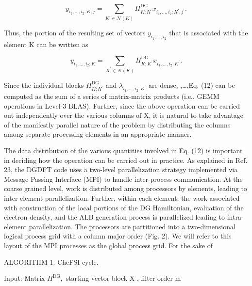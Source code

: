 \documentclass[
  10
]{article}
\begin{document}
\[
y _ {i _ {1}, \dots , i _ {2}; K, j} = \sum_ {K ^ {\prime} \in \mathcal {N} (K)} H _ {K; K ^ {\prime}} ^ {\mathrm{DG}} x _ {i _ {1}, \dots , i _ {2}; K ^ {\prime}, j ^ {\prime}}. \tag {11}
\]

Thus, the portion of the resulting set of vectors
\(y _ { i _ { 1 } , \dots , i _ { 2 } }\) that is associated with the
element K can be written as

\[
y _ {i _ {1}, \dots , i _ {2}; K} = \sum_ {K ^ {\prime} \in \mathcal {N} (K)} H _ {K; K ^ {\prime}} ^ {\mathrm{DG}} x _ {i _ {1}, \dots , i _ {2}; K ^ {\prime}}. \tag {12}
\]

Since the individual blocks
\(H _ { K ; K ^ { \prime } } ^ { \mathrm { { D G } } }\) and
\(\lambda _ { i _ { 1 } , . . . , i _ { 2 } ; K ^ { \prime } }\) are
dense, ,\ldots,Eq. (12) can be computed as the sum of a series of
matrix-matrix products (i.e., GEMM operations in Level-3 BLAS). Further,
since the above operation can be carried out independently over the
various columns of X, it is natural to take advantage of the manifestly
parallel nature of the problem by distributing the columns among
separate processing elements in an appropriate manner.

The data distribution of the various quantities involved in Eq. (12) is
important in deciding how the operation can be carried out in practice.
As explained in Ref. 23, the DGDFT code uses a two-level parallelization
strategy implemented via Message Passing Interface (MPI) to handle
inter-process communication. At the coarse grained level, work is
distributed among processors by elements, leading to inter-element
parallelization. Further, within each element, the work associated with
construction of the local portions of the DG Hamiltonian, evaluation of
the electron density, and the ALB generation process is parallelized
leading to intra-element parallelization. The processors are partitioned
into a two-dimensional logical process grid with a column major order
(Fig. 2). We will refer to this layout of the MPI processes as the
global process grid. For the sake of

ALGORITHM 1. CheFSI cycle.

Input: Matrix \(H ^ { \mathrm { D G } } ,\) starting vector block X ,
filter order m
\end{document}
